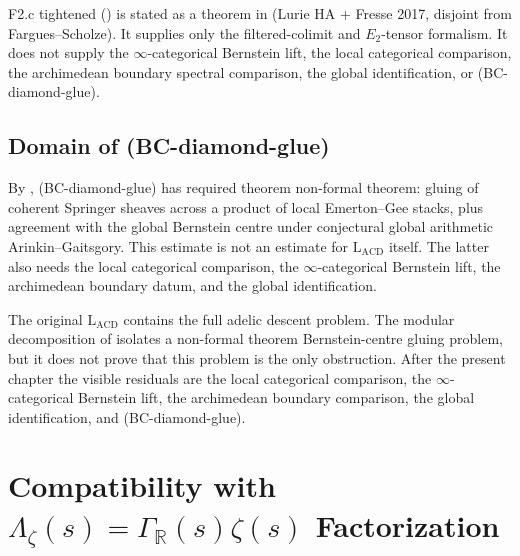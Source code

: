 \begin{remark}
\label{v4-arith:lacd:rem:F2c-closed}
F2.c tightened () is stated as
a \ClaimStatusProvedHere theorem in 
(Lurie HA + Fresse 2017, disjoint from Fargues--Scholze). It supplies
only the filtered-colimit and \(E_{2}\)-tensor formalism. It does not
supply the \(\infty\)-categorical Bernstein lift, the local categorical
comparison, the archimedean boundary spectral comparison, the global
identification, or (BC-diamond-glue).
\end{remark}

\subsection{Domain of (BC-diamond-glue)}

\begin{remark}
\label{v4-arith:lacd:rem:BC-diamond-glue-domain}
By , (BC-diamond-glue)
has required theorem non-formal theorem: gluing of coherent Springer
sheaves across a product of local Emerton--Gee stacks, plus agreement
with the global Bernstein centre under conjectural global arithmetic
Arinkin--Gaitsgory. This estimate is not an estimate for
\(\mathrm{L}_{\mathrm{ACD}}\) itself. The latter also needs the local
categorical comparison, the \(\infty\)-categorical Bernstein lift, the
archimedean boundary datum, and the global identification.
\end{remark}

\begin{remark}
\label{v4-arith:lacd:rem:cumulative-reduction}
The original \(\mathrm{L}_{\mathrm{ACD}}\) contains the full adelic
descent problem. The modular decomposition of
 isolates a
non-formal theorem Bernstein-centre gluing problem, but it does not
prove that this problem is the only obstruction. After the present
chapter the visible residuals are the local categorical comparison,
the \(\infty\)-categorical Bernstein lift, the archimedean boundary
comparison, the global identification, and (BC-diamond-glue).
\end{remark}

\section{Compatibility with \(\Lambda_{\zeta}(s) = \Gamma_{\mathbb{R}}(s)\zeta(s)\) Factorization}
\label{v4-arith:lacd:xi-compat}

